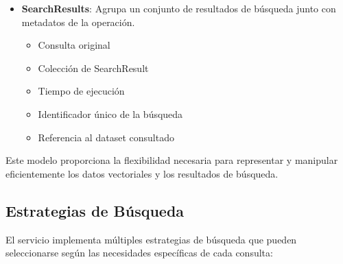 \documentclass[12pt,a4paper]{article}
\begin{document}
\begin{itemize}
    \item \textbf{SearchResults}: Agrupa un conjunto de resultados de búsqueda junto con metadatos de la operación.
    \begin{itemize}
        \item Consulta original
        \item Colección de SearchResult
        \item Tiempo de ejecución
        \item Identificador único de la búsqueda
        \item Referencia al dataset consultado
    \end{itemize}
\end{itemize}

Este modelo proporciona la flexibilidad necesaria para representar y manipular eficientemente los datos vectoriales y los resultados de búsqueda.

\subsection{Estrategias de Búsqueda}
\label{subsec:ss-estrategias}

El servicio implementa múltiples estrategias de búsqueda que pueden seleccionarse según las necesidades específicas de cada consulta:
\end{document}
